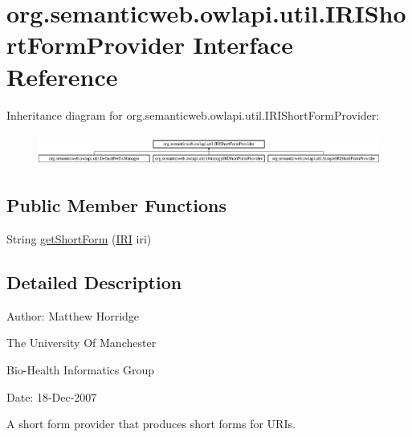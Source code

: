 \hypertarget{interfaceorg_1_1semanticweb_1_1owlapi_1_1util_1_1_i_r_i_short_form_provider}{\section{org.\-semanticweb.\-owlapi.\-util.\-I\-R\-I\-Short\-Form\-Provider Interface Reference}
\label{interfaceorg_1_1semanticweb_1_1owlapi_1_1util_1_1_i_r_i_short_form_provider}
}
Inheritance diagram for org.\-semanticweb.\-owlapi.\-util.\-I\-R\-I\-Short\-Form\-Provider\-:\begin{figure}[H]
\begin{center}
\leavevmode
\includegraphics[height=1.060606cm]{interfaceorg_1_1semanticweb_1_1owlapi_1_1util_1_1_i_r_i_short_form_provider}
\end{center}
\end{figure}
\subsection*{Public Member Functions}
\begin{DoxyCompactItemize}
\item 
String \hyperlink{interfaceorg_1_1semanticweb_1_1owlapi_1_1util_1_1_i_r_i_short_form_provider_ab86f83930304cc46d46e858f6172c1fb}{get\-Short\-Form} (\hyperlink{classorg_1_1semanticweb_1_1owlapi_1_1model_1_1_i_r_i}{I\-R\-I} iri)
\end{DoxyCompactItemize}


\subsection{Detailed Description}
Author\-: Matthew Horridge\par
 The University Of Manchester\par
 Bio-\/\-Health Informatics Group\par
 Date\-: 18-\/\-Dec-\/2007\par
\par


A short form provider that produces short forms for U\-R\-Is. 

